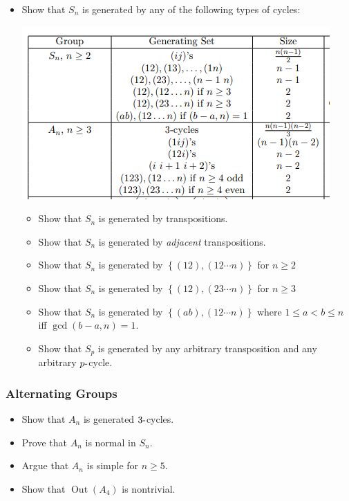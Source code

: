 \begin{itemize}
\item
  Show that \(S_n\) is generated by any of the following types of
  cycles:

  \includegraphics{figures/image_2020-06-12-20-22-43.png}

  \begin{itemize}
  \tightlist
  \item
    Show that \(S_n\) is generated by transpositions.
  \item
    Show that \(S_n\) is generated by \emph{adjacent} transpositions.
  \item
    Show that \(S_n\) is generated by
    \(\left\{{(12), (12\cdots n)}\right\}\) for \(n\geq 2\)
  \item
    Show that \(S_n\) is generated by
    \(\left\{{(12), (23\cdots n)}\right\}\) for \(n\geq 3\)
  \item
    Show that \(S_n\) is generated by
    \(\left\{{(ab), (12\cdots n)}\right\}\) where \(1\leq a<b\leq n\)
    iff \(\gcd(b-a, n) = 1\).
  \item
    Show that \(S_p\) is generated by any arbitrary transposition and
    any arbitrary \(p{\hbox{-}}\)cycle.
  \end{itemize}
\end{itemize}

\hypertarget{alternating-groups}{%
\subsubsection{Alternating Groups}\label{alternating-groups}}

\begin{itemize}
\tightlist
\item
  Show that \(A_n\) is generated \(3{\hbox{-}}\)cycles.
\item
  Prove that \(A_n\) is normal in \(S_n\).
\item
  Argue that \(A_n\) is simple for \(n \geq 5\).
\item
  Show that \(\mathop{\mathrm{Out}}(A_4)\) is nontrivial.
\end{itemize}

